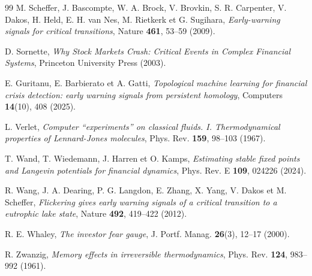 \documentclass[11pt,a4paper]{article}
\begin{document}
\begin{thebibliography}{99}
M. Scheffer, J. Bascompte, W. A. Brock, V. Brovkin, S. R. Carpenter, V. Dakos, H. Held, E. H. van Nes, M. Rietkerk et G. Sugihara, \emph{Early-warning signals for critical transitions}, Nature \textbf{461}, 53--59 (2009).

D. Sornette, \emph{Why Stock Markets Crash: Critical Events in Complex Financial Systems}, Princeton University Press (2003).

E. Guritanu, E. Barbierato et A. Gatti, \emph{Topological machine learning for financial crisis detection: early warning signals from persistent homology}, Computers \textbf{14}(10), 408 (2025).

L. Verlet, \emph{Computer ``experiments'' on classical fluids. I. Thermodynamical properties of Lennard-Jones molecules}, Phys. Rev. \textbf{159}, 98--103 (1967).

T. Wand, T. Wiedemann, J. Harren et O. Kamps, \emph{Estimating stable fixed points and Langevin potentials for financial dynamics}, Phys. Rev. E \textbf{109}, 024226 (2024).

R. Wang, J. A. Dearing, P. G. Langdon, E. Zhang, X. Yang, V. Dakos et M. Scheffer, \emph{Flickering gives early warning signals of a critical transition to a eutrophic lake state}, Nature \textbf{492}, 419--422 (2012).

R. E. Whaley, \emph{The investor fear gauge}, J. Portf. Manag. \textbf{26}(3), 12--17 (2000).

R. Zwanzig, \emph{Memory effects in irreversible thermodynamics}, Phys. Rev. \textbf{124}, 983--992 (1961).

\end{thebibliography}
\end{document}
